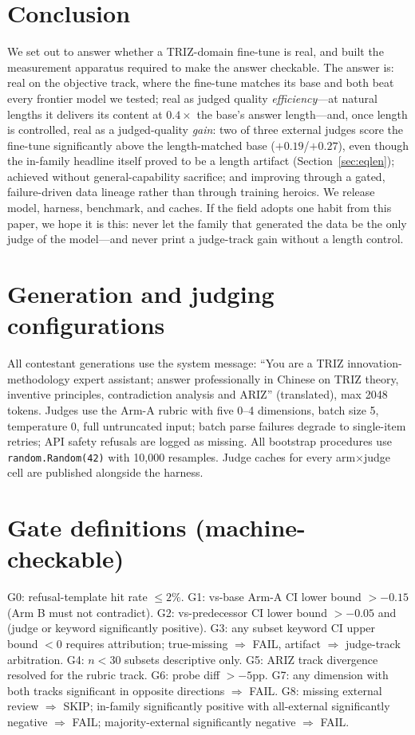 \documentclass[11pt]{article}
\begin{document}
\section{Conclusion}
\label{sec:concl}
We set out to answer whether a TRIZ-domain fine-tune is real, and built
the measurement apparatus required to make the answer checkable. The
answer is: real on the objective track, where the fine-tune matches
its base and both beat every frontier model we tested; real as judged
quality \emph{efficiency}---at natural lengths it delivers its content
at $0.4\times$ the base's answer length---and, once length is
controlled, real as a judged-quality \emph{gain}: two of three
external judges score the fine-tune significantly above the
length-matched base ($+0.19$/$+0.27$), even though the in-family
headline itself proved to be a length artifact
(Section~\ref{sec:eqlen}); achieved
without general-capability sacrifice; and
improving through a gated, failure-driven data lineage rather than
through training heroics. We release model, harness, benchmark, and
caches. If the field adopts one habit from this paper, we hope it is
this: never let the family that generated the data be the only judge of
the model---and never print a judge-track gain without a length
control.

\appendix
\section{Generation and judging configurations}
All contestant generations use the system message: ``You are a TRIZ
innovation-methodology expert assistant; answer professionally in
Chinese on TRIZ theory, inventive principles, contradiction analysis and
ARIZ'' (translated), max 2048 tokens. Judges use the Arm-A rubric with
five 0--4 dimensions, batch size 5, temperature 0, full untruncated
input; batch parse failures degrade to single-item retries; API safety
refusals are logged as missing. All bootstrap procedures use
\texttt{random.Random(42)} with 10{,}000 resamples. Judge caches for
every arm$\times$judge cell are published alongside the harness.

\section{Gate definitions (machine-checkable)}
G0: refusal-template hit rate $\leq 2\%$. G1: vs-base Arm-A CI lower
bound $> -0.15$ (Arm B must not contradict). G2: vs-predecessor CI
lower bound $> -0.05$ and (judge or keyword significantly positive).
G3: any subset keyword CI upper bound $<0$ requires attribution;
true-missing $\Rightarrow$ FAIL, artifact $\Rightarrow$ judge-track
arbitration. G4: $n<30$ subsets descriptive only. G5: ARIZ track
divergence resolved for the rubric track. G6: probe diff $> -5$pp.
G7: any dimension with both tracks significant in opposite directions
$\Rightarrow$ FAIL. G8: missing external review $\Rightarrow$ SKIP;
in-family significantly positive with all-external significantly
negative $\Rightarrow$ FAIL; majority-external significantly negative
$\Rightarrow$ FAIL.
\end{document}
